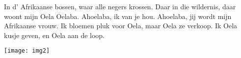 \beginverse
In d' Afrikaanse bossen, waar alle negers krossen.
Daar in die wildernis, daar woont mijn Oela Oelaba.
\endverse
\beginchorus
Ahoelaba, ik van je hou.
Ahoelaba, jij wordt mijn Afrikaanse vrouw.
\endchorus
\beginverse
Ik bloemen pluk voor Oela, maar Oela ze verkoop.
Ik Oela kusje geven, en Oela aan de loop.
\endverse
\endsong
\begin{intersong}
    \texttt{[image: img2]}
\end{intersong}